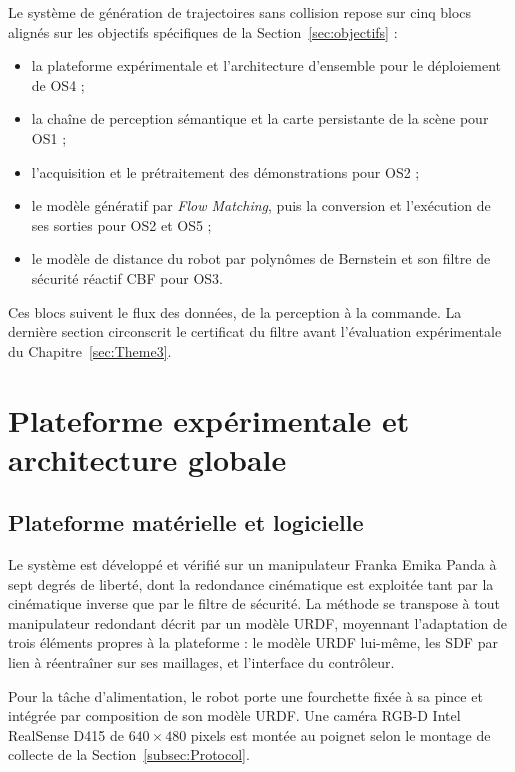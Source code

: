 \label{sec:Theme2}

Le système de génération de trajectoires sans collision repose sur cinq blocs alignés sur les objectifs spécifiques de la Section~\ref{sec:objectifs} :
\begin{itemize}
  \item la plateforme expérimentale et l'architecture d'ensemble pour le déploiement de \acs{OS}4 ;
  \item la chaîne de perception sémantique et la carte persistante de la scène pour \acs{OS}1 ;
  \item l'acquisition et le prétraitement des démonstrations pour \acs{OS}2 ;
  \item le modèle génératif par \textit{Flow Matching}, puis la conversion et l'exécution de ses sorties pour \acs{OS}2 et \acs{OS}5 ;
  \item le modèle de distance du robot par polynômes de Bernstein et son filtre de sécurité réactif \ac{CBF} pour \acs{OS}3.
\end{itemize}
Ces blocs suivent le flux des données, de la perception à la commande. La dernière section circonscrit le certificat du filtre avant l'évaluation expérimentale du Chapitre~\ref{sec:Theme3}.
\section{Plateforme expérimentale et architecture globale}
\subsection{Plateforme matérielle et logicielle}\label{subsec:plateforme}
Le système est développé et vérifié sur un manipulateur Franka Emika Panda à sept degrés de liberté, dont la redondance cinématique est exploitée tant par la cinématique inverse que par le filtre de sécurité. La méthode se transpose à tout manipulateur redondant décrit par un modèle \ac{URDF}, moyennant l'adaptation de trois éléments propres à la plateforme : le modèle \ac{URDF} lui-même, les \ac{SDF} par lien à réentraîner sur ses maillages, et l'interface du contrôleur.

Pour la tâche d'alimentation, le robot porte une fourchette fixée à sa pince et intégrée par composition de son modèle \ac{URDF}. Une caméra \ac{RGB-D} Intel RealSense D415 de $640\times480$ pixels est montée au poignet selon le montage de collecte de la Section~\ref{subsec:Protocol}.

